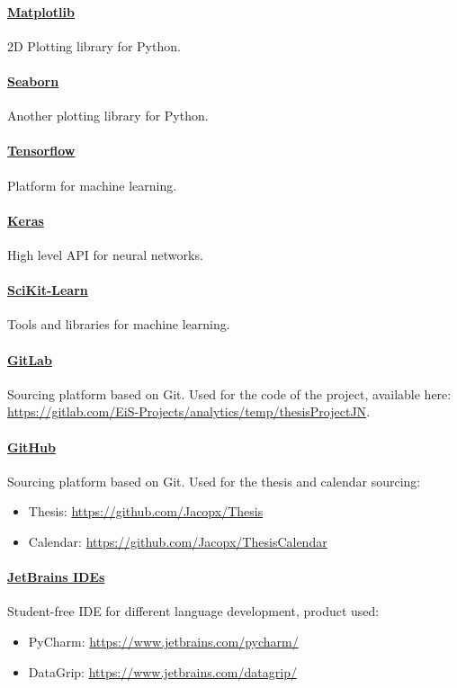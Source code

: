 \documentclass[%
    corpo=12pt,
    twoside,
    oldstyle,
    autoretitolo,
    greek,
    evenboxes,
]{toptesi}
\begin{document}
\paragraph{\href{https://matplotlib.org/}{Matplotlib}} 2D Plotting library for Python.

\paragraph{\href{https://seaborn.pydata.org/}{Seaborn}} Another plotting library for Python.

\paragraph{\href{https://www.tensorflow.org/}{Tensorflow}} Platform for machine learning.

\paragraph{\href{https://keras.io/}{Keras}} High level API for neural networks.

\paragraph{\href{https://scikit-learn.org/stable/}{SciKit-Learn}} Tools and libraries for machine learning.

\paragraph{\href{https://gitlab.com}{GitLab}} Sourcing platform based on Git. Used for the code of the project, available here:\\
\url{https://gitlab.com/EiS-Projects/analytics/temp/thesisProjectJN}.

\paragraph{\href{https://github.com}{GitHub}} Sourcing platform based on Git. Used for the thesis and calendar sourcing:
\begin{itemize}
  \item Thesis: \url{https://github.com/Jacopx/Thesis}
  \item Calendar: \url{https://github.com/Jacopx/ThesisCalendar}
\end{itemize}

\paragraph{\href{https://www.jetbrains.com/}{JetBrains IDEs}} Student-free IDE for different language development, product used:
\begin{itemize}
  \item PyCharm: \url{https://www.jetbrains.com/pycharm/}
  \item DataGrip: \url{https://www.jetbrains.com/datagrip/}
\end{itemize}
\end{document}
